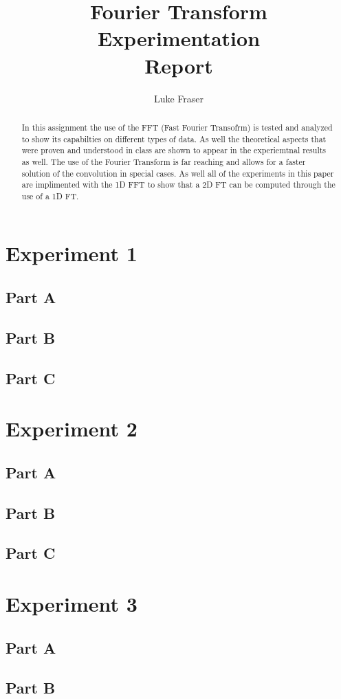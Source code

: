 \documentclass[letter]{article}
\title{Fourier Transform Experimentation \\ Report}
\author{Luke Fraser}
\begin{document}
\maketitle

\begin{abstract}
In this assignment the use of the FFT (Fast Fourier Transofrm) is tested and analyzed to show its capabilties on different types of data. As well the theoretical aspects that were proven and understood in class are shown to appear in the experiemtnal results as well. The use of the Fourier Transform is far reaching and allows for a faster solution of the convolution in special cases. As well all of the experiments in this paper are implimented with the 1D FFT to show that a 2D FT can be computed through the use of a 1D FT.
\end{abstract}

\section{Experiment 1}
\subsection{Part A}
\subsection{Part B}
\subsection{Part C}
\section{Experiment 2}
\subsection{Part A}
\subsection{Part B}
\subsection{Part C}
\section{Experiment 3}
\subsection{Part A}
\subsection{Part B}
\end{document}
